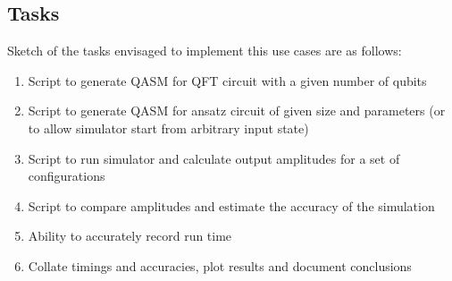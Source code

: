\documentclass[11pt, a4paper]{article}
\begin{document}
\subsection{Tasks}
Sketch of the tasks envisaged to implement this use cases are as follows:

\begin{enumerate}
\item Script to generate QASM for QFT circuit with a given number of qubits
\item Script to generate QASM for ansatz circuit of given size and parameters (or to allow simulator start from arbitrary input state)
\item Script to run simulator and calculate output amplitudes for a set of configurations
\item Script to compare amplitudes and estimate the accuracy of the simulation
\item Ability to accurately record run time
\item Collate timings and accuracies, plot results and document conclusions
\end{enumerate}



\end{document}
